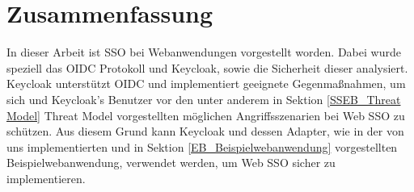 \section{Zusammenfassung}

In dieser Arbeit ist SSO bei Webanwendungen vorgestellt worden. Dabei wurde speziell das OIDC Protokoll und Keycloak, sowie die Sicherheit dieser analysiert. Keycloak unterstützt OIDC und implementiert geeignete Gegenmaßnahmen, um sich und Keycloak's Benutzer vor den unter anderem in Sektion \ref{SSEB_Threat Model} Threat Model vorgestellten möglichen Angriffsszenarien bei Web SSO zu schützen. Aus diesem Grund kann Keycloak und dessen Adapter, wie in der von uns implementierten und in Sektion \ref{EB_Beispielwebanwendung} vorgestellten Beispielwebanwendung, verwendet werden, um Web SSO sicher zu implementieren.

